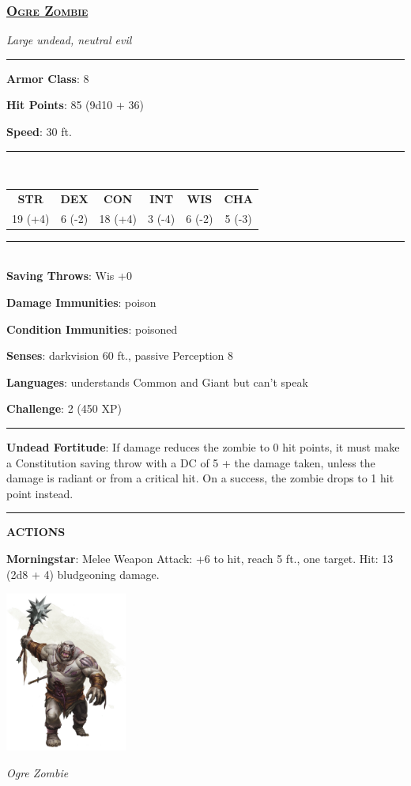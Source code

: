 \subsubsection*{\underline{\textsc{\Large Ogre Zombie}}}
\noindent\emph{Large undead, neutral evil}

\noindent\rule{0.5\textwidth}{0.5pt}

\noindent\textbf{Armor Class}: 8

\noindent\textbf{Hit Points}: 85 (9d10 + 36)

\noindent\textbf{Speed}: 30 ft.

\noindent\rule{0.5\textwidth}{0.5pt} \\
\begin{table}[H]
	\begin{tabular}{cccccc}
		\textbf{STR} & \textbf{DEX} & \textbf{CON} & \textbf{INT} & \textbf{WIS} & \textbf{CHA} \\
		19 (+4) & 6 (-2) & 18 (+4) & 3 (-4) & 6 (-2) & 5 (-3) \\
	\end{tabular}
\end{table}
\noindent\rule{0.5\textwidth}{0.5pt} \\

\noindent\textbf{Saving Throws}: Wis +0

\noindent\textbf{Damage Immunities}: poison

\noindent\textbf{Condition Immunities}: poisoned

\noindent\textbf{Senses}: darkvision 60 ft., passive Perception 8

\noindent\textbf{Languages}: understands Common and Giant but can't speak

\noindent\textbf{Challenge}: 2 (450 XP)

\noindent\rule{0.5\textwidth}{0.5pt}

\noindent\textbf{Undead Fortitude}: If damage reduces the zombie to 0 hit points, it must make a Constitution saving throw with a DC of 5 + the damage taken, unless the damage is radiant or from a critical hit. On a success, the zombie drops to 1 hit point instead.

\noindent\rule{0.5\textwidth}{0.5pt}

\noindent\textbf{ACTIONS}

\noindent\textbf{Morningstar}: Melee Weapon Attack: +6 to hit, reach 5 ft., one target. Hit: 13 (2d8 + 4) bludgeoning damage.

\begin{center}
	\includegraphics[width = 0.3\textwidth]{ogre-zombie}
	
	\emph{Ogre Zombie}
\end{center}